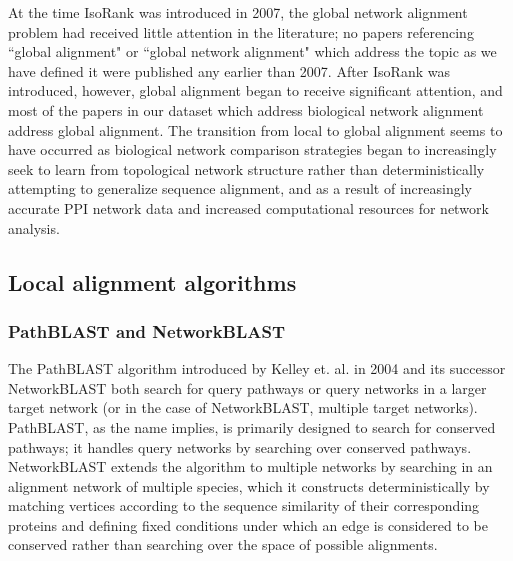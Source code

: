 \documentclass[12pt]{thesis}
\theoremstyle{plain}
\theoremstyle{definition}
\theoremstyle{remark}
\begin{document}
At the time IsoRank \cite{Singh_2007} was introduced in 2007, the global network alignment problem had received little attention in the literature; no papers referencing ``global alignment" or ``global network alignment" which address the topic as we have defined it were published any earlier than 2007. After IsoRank was introduced, however, global alignment began to receive significant attention, and most of the papers in our dataset which address biological network alignment address global alignment. The transition from local to global alignment seems to have occurred as biological network comparison strategies began to increasingly seek to learn from topological network structure rather than deterministically attempting to generalize sequence alignment, and as a result of increasingly accurate PPI network data and increased computational resources for network analysis.

\subsection{Local alignment algorithms}

\subsubsection{PathBLAST and NetworkBLAST} The PathBLAST algorithm introduced by Kelley et. al. in 2004 \cite{kelley2004pathblast} and its successor NetworkBLAST \cite{Sharan_2005, Sharan_2006} both search for query pathways or query networks in a larger target network (or in the case of NetworkBLAST, multiple target networks). PathBLAST, as the name implies, is primarily designed to search for conserved pathways; it handles query networks by searching over conserved pathways. NetworkBLAST extends the algorithm to multiple networks by searching in an alignment network of multiple species, which it constructs deterministically by matching vertices according to the sequence similarity of their corresponding proteins and defining fixed conditions under which an edge is considered to be conserved rather than searching over the space of possible alignments.
\end{document}
